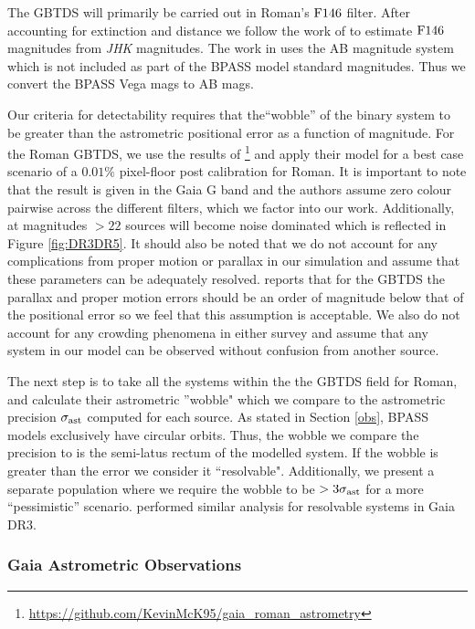 \documentclass{pas}
\begin{document}
The GBTDS will primarily be carried out in Roman's $\rm{F146}$ filter. After accounting for extinction and distance we follow the work of  \citet{2023ApJS..269....5W} to estimate $\rm{F146}$ magnitudes from \textit{JHK} magnitudes. The work in \citet{2023ApJS..269....5W} uses the AB magnitude system which is not included as part of the \textsc{BPASS} model standard magnitudes. Thus we convert the \textsc{BPASS} Vega mags to AB mags.

Our criteria for detectability requires that the``wobble'' of the binary system to be greater than the astrometric positional error as a function of magnitude. For the Roman GBTDS, we use the results of \citet{2026PASP..138d4507M}\footnote{\url{https://github.com/KevinMcK95/gaia_roman_astrometry}} and apply their model for a best case scenario of a $0.01\%$ pixel-floor post calibration for Roman. It is important to note that the result is given in the Gaia G band and the authors assume zero colour pairwise across the different filters, which we factor into our work. Additionally, at magnitudes $>22$ sources will become noise dominated \citep{2024ApJ...965..138F, 2026PASP..138d4507M} which is reflected in Figure \ref{fig:DR3DR5}. It should also be noted that we do not account for any complications from proper motion or parallax in our simulation and assume that these parameters can be adequately resolved. \citet{2026PASP..138d4507M} reports that for the GBTDS the parallax and proper motion errors should be an order of magnitude below that of the positional error so we feel that this assumption is acceptable. We also do not account for any crowding phenomena in either survey and assume that any system in our model can be observed without confusion from another source. 

The next step is to take all the systems within the the GBTDS field for Roman, and calculate their astrometric ''wobble" which we compare to the astrometric precision $\rm{\sigma_{ast}}$ computed for each source. As stated in Section \ref{obs}, \textsc{BPASS} models exclusively have circular orbits. Thus, the wobble we compare the precision to is the semi-latus rectum of the modelled system. If the wobble is greater than the error we consider it ``resolvable". Additionally, we present a separate population where we require the wobble to be $>3\sigma_{\rm{ast}}$ for a more ``pessimistic'' scenario. \citet{2022ApJ...931..107C} performed similar analysis for resolvable systems in Gaia DR3. 

\subsubsection{Gaia Astrometric Observations}\label{mockGaia}
\end{document}
